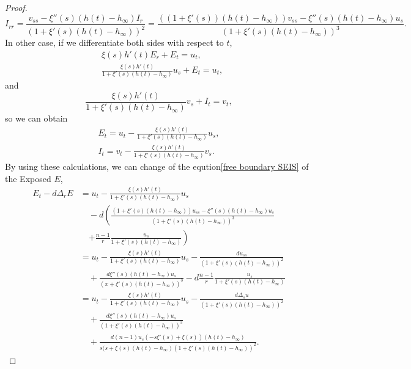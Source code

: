 \documentclass[10pt,a4paper]{amsart}
\begin{document}
\begin{proof}
\begin{equation*}
	I_{rr}= \frac{v_{ss}-\xi''(s)(h(t)-h_\infty)I_r}{(1+\xi'(s)(h(t)-h_\infty))^2}=\frac{((1+\xi'(s))(h(t)-h_\infty))v_{ss}-\xi''(s)(h(t)-h_\infty)u_s}{(1+\xi'(s)(h(t)-h_\infty))^3}.
\end{equation*}
In other case, if we differentiate both sides with respect to $t$,
\begin{equation*}
	\begin{aligned}
		&\xi(s)h'(t)E_r+E_t=u_t,\\
		&\frac{\xi(s)h'(t)}{1+\xi'(s)(h(t)-h_\infty)}u_s+E_t=u_t,
	\end{aligned}
\end{equation*}
and
\begin{equation*}
	\frac{\xi(s)h'(t)}{1+\xi'(s)(h(t)-h_\infty)}v_s+I_t=v_t,
\end{equation*}
so we can obtain
\begin{equation*}
	\begin{aligned}
		E_t=u_t-\frac{\xi(s)h'(t)}{1+\xi'(s)(h(t)-h_\infty)}u_s,\\
		I_t=v_t-\frac{\xi(s)h'(t)}{1+\xi'(s)(h(t)-h_\infty)}v_s.
	\end{aligned}
\end{equation*}
By using these calculations, we can change of the eqution\cref{free boundary SEIS} of the Exposed $E$,
\begin{equation}\label{modified free boundary SEIS3}
	\begin{aligned}
		E_t-d\Delta_rE&=u_t-\frac{\xi(s)h'(t)}{1+\xi'(s)(h(t)-h_\infty)}u_s\\
		&\quad -d\left(\frac{(1+\xi'(s)(h(t)-h_\infty))u_{ss}-\xi''(s)(h(t)-h_\infty)u_s}{(1+\xi'(s)(h(t)-h_\infty))^3}\right.\\
		&\quad \left.+\frac{n-1}{r}\frac{u_s}{1+\xi'(s)(h(t)-h_\infty)}\right)\\
		&=u_t-\frac{\xi(s)h'(t)}{1+\xi'(s)(h(t)-h_\infty)}u_s-\frac{du_{ss}}{(1+\xi'(s)(h(t)-h_\infty))^2}\\
		&\quad +\frac{d\xi''(s)(h(t)-h_\infty)u_s}{(x+\xi'(s)(h(t)-h_\infty))^3}-d\frac{n-1}{r}\frac{u_s}{1+\xi'(s)(h(t)-h_\infty)}\\
		&=u_t-\frac{\xi(s)h'(t)}{1+\xi'(s)(h(t)-h_\infty)}u_s-\frac{d\Delta_s u}{(1+\xi'(s)(h(t)-h_\infty))^2}\\
		&\quad +\frac{d\xi''(s)(h(t)-h_\infty)u_s}{(1+\xi'(s)(h(t)-h_\infty))^3}\\
		&\quad +\frac{d(n-1)u_s(-s\xi'(s)+\xi(s))(h(t)-h_\infty)}{s(s+\xi(s)(h(t)-h_\infty)(1+\xi'(s)(h(t)-h_\infty))^2}.
	\end{aligned}

\end{equation}
\end{proof}
\end{document}
